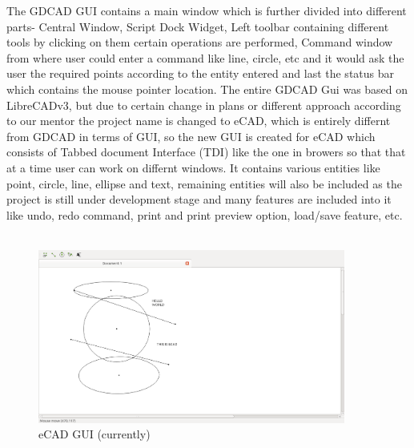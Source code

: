 The GDCAD GUI contains a main window which is further divided into different parts- Central Window, Script Dock Widget, Left toolbar containing different tools by clicking on them certain operations are performed, Command window from where user could enter a command like line, circle, etc and it would ask the user the required points according to the entity entered and last the status bar which contains the mouse pointer location. The entire GDCAD Gui was based on LibreCADv3, but due to certain change in plans or different approach according to our mentor the project name is changed to eCAD, which is entirely differnt from GDCAD in terms of GUI, so the new GUI is created for eCAD which consists of Tabbed document Interface (TDI) like the one in browers so that that at a time user can work on differnt windows. It contains various entities like point, circle, line, ellipse and text, remaining entities will also be included as the project is still under development stage and many features are included into it like undo, redo command, print and print preview option, load/save feature, etc.\\\\

\begin{figure}[!ht]
\centering
\includegraphics[width=0.9\textwidth]{images/ecad.png}                   
\caption{eCAD GUI (currently)}
\end{figure}
